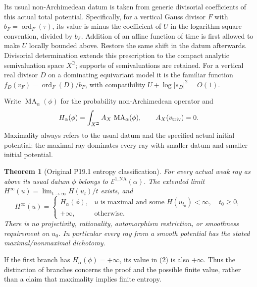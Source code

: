 \documentclass[11pt]{article}
\newcommand{\MA}{\operatorname{MA}}
\newcommand{\NA}{\mathrm{NA}}
\newcommand{\ord}{\operatorname{ord}}
\newtheorem{theorem}{Theorem}
\begin{document}
Its usual non-Archimedean datum is taken from generic divisorial
coefficients of this actual total potential. Specifically, for a
vertical Gauss divisor $F$ with $b_F=\ord_F(\tau)$, its value is minus
the coefficient of $U$ in the logarithm-square convention, divided by
$b_F$. Addition of an affine function of time is first allowed
to make $U$ locally bounded
above. Restore the same shift in the datum afterwards. Divisorial
determination extends this prescription to the compact analytic
semivaluation space $X^\beth$; supports of semivaluations are retained.
For a vertical real divisor $D$ on a dominating equivariant model it is
the familiar function
$f_D(v_F)=\ord_F(D)/b_F$, with compatibility
$U+\log|s_D|^2=O(1)$.

Write $\MA_\alpha(\phi)$ for the probability non-Archimedean operator
and
\[
 H_\alpha(\phi)=\int_{X^\beth}A_X\,\MA_\alpha(\phi),
 \qquad A_X(v_{\rm triv})=0.
\]
Maximality always refers to the usual datum and the specified actual
initial potential: the maximal ray dominates every ray with smaller
datum and smaller initial potential.

\begin{theorem}[Original P19.1 entropy classification]
For every actual weak ray as above its usual datum
$\phi$ belongs to $\mathcal E^{1,\NA}(\alpha)$. The extended limit
$H^\infty(u)=\lim_{t\to\infty}H(u_t)/t$ exists, and
\[
 H^\infty(u)=
 \begin{cases}
 H_\alpha(\phi),&u\text{ is maximal and some }H(u_{t_0})<\infty,
                    \quad t_0\geq0,\\
 +\infty,&\text{otherwise}.
 \end{cases}                                                \tag{2}
\]
There is no projectivity, rationality, automorphism restriction, or
smoothness requirement on $u_0$. In particular every ray from a smooth
potential has the stated maximal/nonmaximal dichotomy.
\end{theorem}
If the first branch has $H_\alpha(\phi)=+\infty$, its value in (2) is
also $+\infty$. Thus the distinction of branches concerns the proof
and the possible finite value, rather than a claim that maximality
implies finite entropy.
\end{document}
